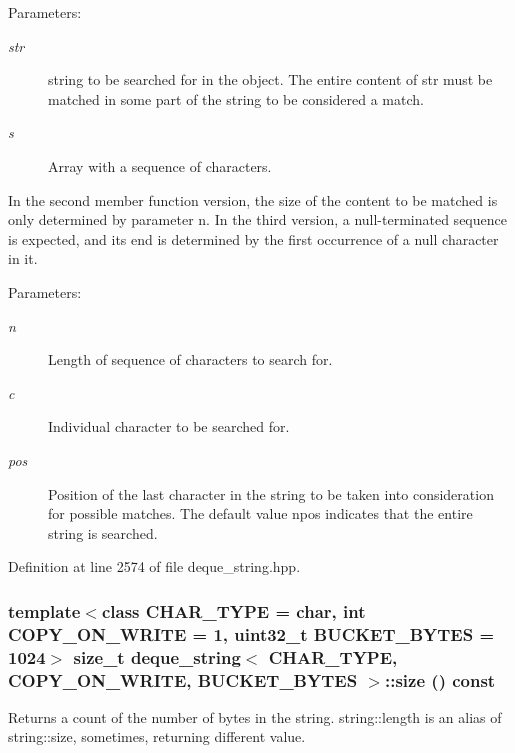 \begin{Desc}
\item[Parameters:]
\begin{description}
\item[{\em str}]string to be searched for in the object. The entire content of str must be matched in some part of the string to be considered a match. \item[{\em s}]Array with a sequence of characters.\end{description}
\end{Desc}
In the second member function version, the size of the content to be matched is only determined by parameter n. In the third version, a null-terminated sequence is expected, and its end is determined by the first occurrence of a null character in it. \begin{Desc}
\item[Parameters:]
\begin{description}
\item[{\em n}]Length of sequence of characters to search for. \item[{\em c}]Individual character to be searched for. \item[{\em pos}]Position of the last character in the string to be taken into consideration for possible matches. The default value npos indicates that the entire string is searched. \end{description}
\end{Desc}


Definition at line 2574 of file deque\_\-string.hpp.\hypertarget{classdeque__string_52cac1c0f0f3f5557773b4f7ce9d53b7}{
\subsubsection[{size}]{\setlength{\rightskip}{0pt plus 5cm}template$<$class CHAR\_\-TYPE  = char, int COPY\_\-ON\_\-WRITE = 1, uint32\_\-t BUCKET\_\-BYTES = 1024$>$ size\_\-t {\bf deque\_\-string}$<$ CHAR\_\-TYPE, COPY\_\-ON\_\-WRITE, BUCKET\_\-BYTES $>$::size () const}}
\label{classdeque__string_52cac1c0f0f3f5557773b4f7ce9d53b7}


Returns a count of the number of bytes in the string. string::length is an alias of string::size, sometimes, returning different value. 

